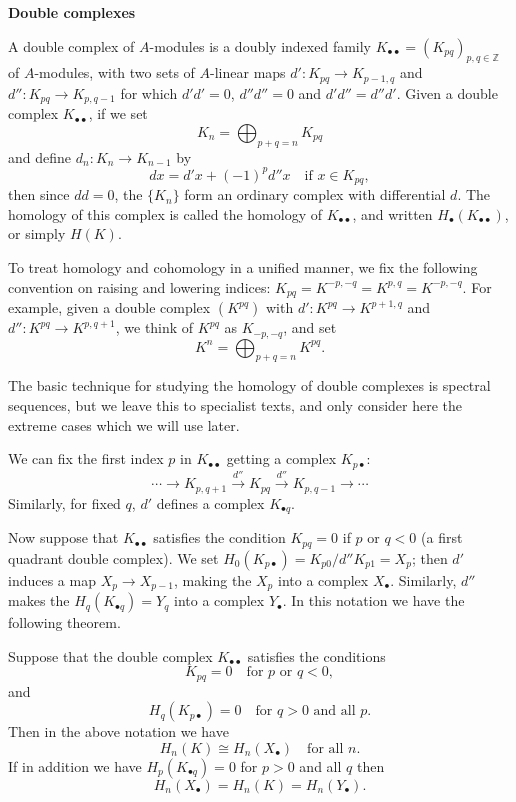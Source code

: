 \medskip
\noindent\textbf{Double complexes}

A double complex of $A$-modules is a doubly indexed family
$K_{\bullet\bullet} = (K_{pq})_{p, q \in \mathbb{Z}}$ of $A$-modules, with two sets of $A$-linear maps
$d'\colon K_{pq} \to K_{p-1,q}$ and $d''\colon K_{pq} \to K_{p,q-1}$ for which $d'd' = 0$, $d''d'' = 0$ and
$d'd'' = d''d'$. Given a double complex $K_{\bullet\bullet}$, if we set
\[
  K_n = \bigoplus_{p + q = n} K_{pq}
\]
and define $d_n\colon K_n \to K_{n-1}$ by
\[
  dx = d'x + (-1)^p d''x \quad \text{if } x \in K_{pq},
\]
then since $dd = 0$, the $\{K_n\}$ form an ordinary complex with differential $d$. The
homology of this complex is called the homology of $K_{\bullet\bullet}$, and written
$H_\bullet(K_{\bullet\bullet})$, or simply $H(K)$.

To treat homology and cohomology in a unified manner, we fix the following
convention on raising and lowering indices: $K_{pq} = K^{-p,-q} = K^{p,q} = K^{-p,-q}$.
For example, given a double complex $(K^{pq})$ with
$d'\colon K^{pq} \to K^{p+1,q}$ and $d''\colon K^{pq} \to K^{p,q+1}$, we think of $K^{pq}$ as
$K_{-p,-q}$, and set
\[
  K^n = \bigoplus_{p + q = n} K^{pq}.
\]

The basic technique for studying the homology of double complexes is spectral
sequences, but we leave this to specialist texts, and only consider here the
extreme cases which we will use later.

We can fix the first index $p$ in $K_{\bullet\bullet}$ getting a complex $K_{p\bullet}$:
\[
  \cdots \to K_{p,q+1} \xrightarrow{d''} K_{pq} \xrightarrow{d''} K_{p,q-1} \to \cdots
\]
Similarly, for fixed $q$, $d'$ defines a complex $K_{\bullet q}$.

Now suppose that $K_{\bullet\bullet}$ satisfies the condition $K_{pq} = 0$ if $p$ or $q < 0$ (a
first quadrant double complex). We set $H_0(K_{p\bullet}) = K_{p0}/d''K_{p1} = X_p$; then
$d'$ induces a map $X_p \to X_{p-1}$, making the $X_p$ into a complex $X_\bullet$. Similarly,
$d''$ makes the $H_q(K_{\bullet q}) = Y_q$ into a complex $Y_\bullet$. In this notation we have
the following theorem.

\begin{theorem}\label{thm:B1}
Suppose that the double complex $K_{\bullet\bullet}$ satisfies the conditions
\[
  K_{pq} = 0 \quad \text{for } p \text{ or } q < 0,
\]
and
\[
  H_q(K_{p\bullet}) = 0 \quad \text{for } q > 0 \text{ and all } p.
\]
Then in the above notation we have
\[
  H_n(K) \cong H_n(X_\bullet) \quad \text{for all } n.
\]
If in addition we have $H_p(K_{\bullet q}) = 0$ for $p > 0$ and all $q$ then
\[
  H_n(X_\bullet) = H_n(K) = H_n(Y_\bullet).
\]
\end{theorem}

